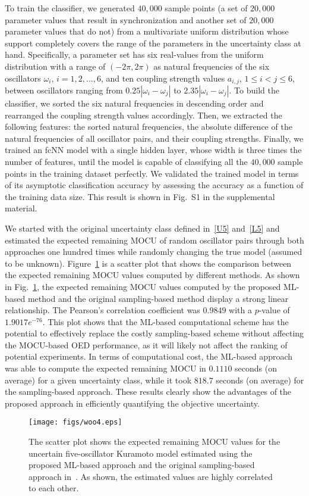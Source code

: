 \documentclass{article}
\begin{document}
To train the classifier, we generated $40,000$ sample points (a set of $20,000$ parameter values that result in synchronization and another set of $20,000$ parameter values that do not) from a multivariate uniform distribution whose support completely covers the range of the parameters in the uncertainty class at hand. Specifically, a parameter set has six real-values from the uniform distribution with a range of ${\left( -2\pi, 2\pi\right)}$ as natural frequencies of the six oscillators ${\omega_i}$, ${i=1,2,\dots,6}$, and ten coupling strength values ${a_{i,j}}$, ${1 \le i < j \le 6}$, between oscillators ranging from ${0.25 \left|\omega_i - \omega_j\right|}$ to ${2.35 \left|\omega_i - \omega_j\right|}$. To build the classifier, we sorted the six natural frequencies in descending order and rearranged the coupling strength values accordingly. Then, we extracted the following features: the sorted natural frequencies, the absolute difference of the natural frequencies of all oscillator pairs, and their coupling strengths. Finally, we trained an fcNN model with a single hidden layer, whose width is three times the number of features, until the model is capable of classifying all the $40,000$ sample points in the training dataset perfectly. We validated the trained model in terms of its asymptotic classification accuracy by assessing the accuracy as a function of the training data size. This result is shown in Fig.~S1 in the supplemental material.

We started with the original uncertainty class defined in~\eqref{U5} and~\eqref{L5} and estimated the expected remaining MOCU of random oscillator pairs through both approaches one hundred times while randomly changing the true model (assumed to be unknown). Figure~\ref{fig4} is a scatter plot that shows the comparison between the expected remaining MOCU values computed by different methods. As shown in Fig.~\ref{fig4}, the expected remaining MOCU values computed by the proposed ML-based method and the original sampling-based method display a strong linear relationship. The Pearson's correlation coefficient was $0.9849$ with a ${p}$-value of $1.9017e^{-76}$. This plot shows that the ML-based computational scheme has the potential to effectively replace the costly sampling-based scheme without affecting the MOCU-based OED performance, as it will likely not affect the ranking of potential experiments. In terms of computational cost, the ML-based approach was able to compute the expected remaining MOCU in ${0.1110}$ seconds (on average) for a given uncertainty class, while it took ${818.7}$ seconds (on average) for the sampling-based approach. These results clearly show the advantages of the proposed approach in efficiently quantifying the objective uncertainty. 
\begin{figure}
\centering
\texttt{[image: figs/woo4.eps]}
\caption{The scatter plot shows the expected remaining MOCU values for the uncertain five-oscillator Kuramoto model estimated using the proposed ML-based approach and the original sampling-based approach in~\cite{Hong2021}. As shown, the estimated values are highly correlated to each other.}
\label{fig4}
\end{figure}
\end{document}
